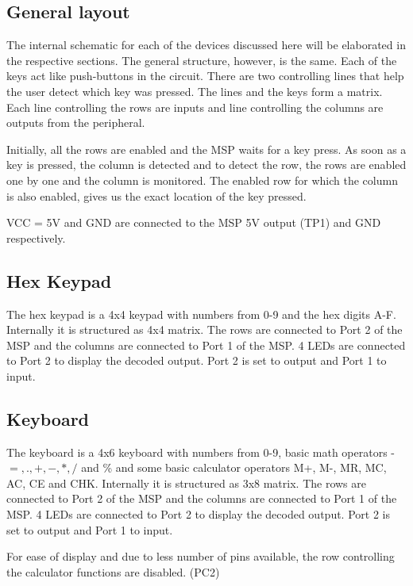 \documentclass[12pt, letterpaper]{article}
\begin{document}
\subsection{General layout}

The internal schematic for each of the devices discussed here will be elaborated in the respective sections. The general structure, however, is the same. Each of the keys act like push-buttons in the circuit. There are two controlling lines that help the user detect which key was pressed. The lines and the keys form a matrix. Each line controlling the rows are inputs and line controlling the columns are outputs from the peripheral. 

Initially, all the rows are enabled and the MSP waits for a key press. As soon as a key is pressed, the column is detected and to detect the row, the rows are enabled one by one and the column is monitored. The enabled row for which the column is also enabled, gives us the exact location of the key pressed.

VCC = 5V and GND are connected to the MSP 5V output (TP1) and GND respectively.  

\subsection{Hex Keypad}

The hex keypad is a 4x4 keypad with numbers from 0-9 and the hex digits A-F. Internally it is structured as 4x4 matrix. The rows are connected to Port 2 of the MSP and the columns are connected to Port 1 of the MSP. 4 LEDs are connected to Port 2 to display the decoded output. Port 2 is set to output and Port 1 to input. 

\subsection{Keyboard}

The keyboard is a 4x6 keyboard with numbers from 0-9, basic math operators - $ =, ., +, -, *, / $ and \% and some basic calculator operators M+, M-, MR, MC, AC, CE and CHK. Internally it is structured as 3x8 matrix. The rows are connected to Port 2 of the MSP and the columns are connected to Port 1 of the MSP. 4 LEDs are connected to Port 2 to display the decoded output. Port 2 is set to output and Port 1 to input. 

For ease of display and due to less number of pins available, the row controlling the calculator functions are disabled. (PC2)
\end{document}
